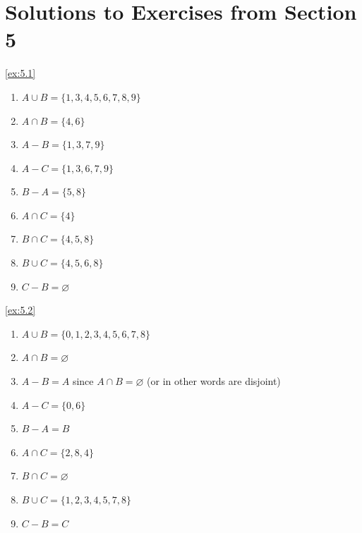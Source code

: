 
\section*{Solutions to Exercises from Section 5}
\begin{solution}\label{sol:5.1}\ref{ex:5.1}
    \begin{enumerate}
        \item $A\cup B=\{ 1,3,4,5,6,7,8,9 \}$
        \item $A\cap B=\{ 4,6 \}$
        \item $A-B=\{ 1,3,7,9 \}$
        \item $A-C=\{ 1,3,6,7,9 \}$
        \item $B-A=\{ 5,8 \}$
        \item $A\cap C=\{ 4 \}$
        \item $B\cap C=\{ 4,5,8 \}$
        \item $B\cup C=\{ 4,5,6,8 \}$
        \item $C-B=\varnothing$
    \end{enumerate}
\end{solution}

\begin{solution}\label{sol:5.2}\ref{ex:5.2}
    \begin{enumerate}
        \item $A\cup B=\{ 0,1,2,3,4,5,6,7,8 \}$
        \item $A\cap B=\varnothing$
        \item $A-B=A$ since $A\cap B=\varnothing$ (or in other words are disjoint)
        \item $A-C=\{ 0,6 \}$
        \item $B-A=B$ 
        \item $A\cap C=\{ 2,8,4 \}$
        \item $B\cap C=\varnothing$
        \item $B\cup C=\{ 1,2,3,4,5,7,8 \}$
        \item $C-B=C$
    \end{enumerate}
\end{solution}